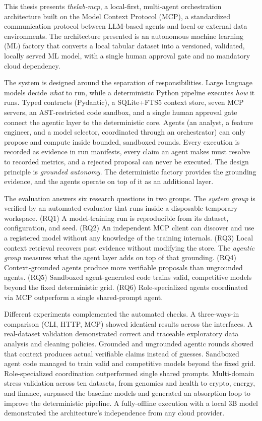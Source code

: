 
This thesis presents \emph{thelab-mcp}, a local-first, multi-agent orchestration architecture built on the Model Context Protocol (MCP), a standardized communication protocol between LLM-based agents and local or external data environments. The architecture presented is an autonomous machine learning (ML) factory that converts a local tabular dataset into a versioned, validated, locally served ML model, with a single human approval gate and no mandatory cloud dependency.

The system is designed around the separation of responsibilities. Large language models decide \emph{what} to run, while a deterministic Python pipeline executes \emph{how} it runs. Typed contracts (Pydantic), a SQLite+FTS5 context store, seven MCP servers, an AST-restricted code sandbox, and a single human approval gate connect the agentic layer to the deterministic core. Agents (an analyst, a feature engineer, and a model selector, coordinated through an orchestrator) can only propose and compute inside bounded, sandboxed rounds. Every execution is recorded as evidence in run manifests, every claim an agent makes must resolve to recorded metrics, and a rejected proposal can never be executed. The design principle is \emph{grounded autonomy}. The deterministic factory provides the grounding evidence, and the agents operate on top of it as an additional layer.

The evaluation answers six research questions in two groups. The \emph{system group} is verified by an automated evaluator that runs inside a disposable temporary workspace. (RQ1) A model-training run is reproducible from its dataset, configuration, and seed. (RQ2) An independent MCP client can discover and use a registered model without any knowledge of the training internals. (RQ3) Local context retrieval recovers past evidence without modifying the store. The \emph{agentic group} measures what the agent layer adds on top of that grounding. (RQ4) Context-grounded agents produce more verifiable proposals than ungrounded agents. (RQ5) Sandboxed agent-generated code trains valid, competitive models beyond the fixed deterministic grid. (RQ6) Role-specialized agents coordinated via MCP outperform a single shared-prompt agent.

Different experiments complemented the automated checks. A three-ways-in comparison (CLI, HTTP, MCP) showed identical results across the interfaces. A real-dataset validation demonstrated correct and traceable exploratory data analysis and cleaning policies. Grounded and ungrounded agentic rounds showed that context produces actual verifiable claims instead of guesses. Sandboxed agent code managed to train valid and competitive models beyond the fixed grid. Role-specialized coordination outperformed single shared prompts. Multi-domain stress validation across ten datasets, from genomics and health to crypto, energy, and finance, surpassed the baseline models and generated an absorption loop to improve the deterministic pipeline. A fully-offline execution with a local 3B model demonstrated the architecture's independence from any cloud provider.


